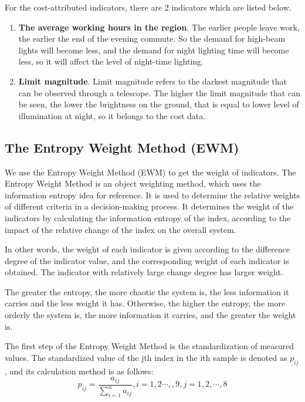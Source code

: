 For the cost-attributed indicators, there are 2 indicators which are listed below.
\begin{enumerate}
    \item \textbf{The average working hours in the region}. The earlier people leave work, the earlier the end of the evening commute. So the demand for high-beam lights will become less, and the demand for night lighting time will become less, so it will affect the level of night-time lighting.
    
    \item \textbf{Limit magnitude}. Limit magnitude refers to the darkest magnitude that can be observed through a telescope. The higher the limit magnitude that can be seen, the lower the brightness on the ground, that is equal to lower level of illumination at night, so it belongs to the cost data.
\end{enumerate}





\subsection{The Entropy Weight Method (EWM) }
We use the Entropy Weight Method (EWM) to get the weight of indicators. The Entropy Weight Method is an object weighting method, which uses the information entropy idea for reference. It is used to determine the relative weights of different criteria in a decision-making process. It determines the weight of the indicators by calculating the information entropy of the index, according to the impact of the relative change of the index on the overall system.

In other words, the weight of each indicator is given according to the difference degree of the indicator value, and the corresponding weight of each indicator is obtained. The indicator with relatively large change degree has larger weight. 

The greater the entropy, the more chaotic the system is, the less information it carries and the less weight it has. Otherwise, the higher the entropy, the more orderly the system is, the more information it carries, and the greater the weight is.

The first step of the Entropy Weight Method is the standardization of measured values. The standardized value of the jth index in the ith sample is denoted as $p_{ij}$, and its calculation method is as follows:$$p_{ij}=\frac{a_{ij}}{\sum_{i=1}^na_{ij}},i=1,2\cdots,,9,j=1,2,\cdots,8$$

